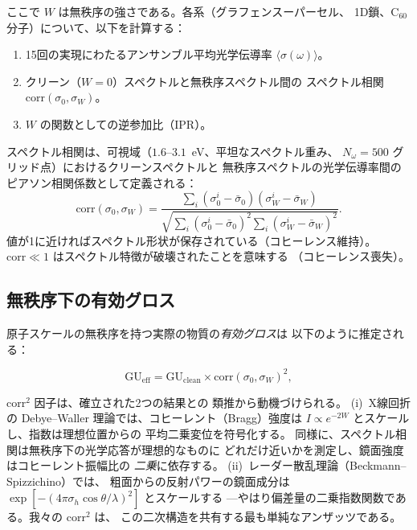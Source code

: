 \documentclass[twocolumn,showpacs,preprintnumbers,amsmath,amssymb,prb]{revtex4-2}
\begin{document}
\noindent ここで $W$ は無秩序の強さである。各系（グラフェンスーパーセル、
1D鎖、C$_{60}$ 分子）について、以下を計算する：

\begin{enumerate}
  \item 15回の実現にわたるアンサンブル平均光学伝導率
    $\langle\sigma(\omega)\rangle$。
  \item クリーン（$W=0$）スペクトルと無秩序スペクトル間の
    スペクトル相関 $\mathrm{corr}(\sigma_0, \sigma_W)$。
  \item $W$ の関数としての逆参加比（IPR）。
\end{enumerate}

スペクトル相関は、可視域（$1.6$--$3.1$~eV、平坦なスペクトル重み、
$N_\omega = 500$ グリッド点）におけるクリーンスペクトルと
無秩序スペクトルの光学伝導率間のピアソン相関係数として定義される：
\begin{equation}
  \mathrm{corr}(\sigma_0, \sigma_W) =
  \frac{\sum_i (\sigma_0^i - \bar{\sigma}_0)
        (\sigma_W^i - \bar{\sigma}_W)}
  {\sqrt{\sum_i (\sigma_0^i - \bar{\sigma}_0)^2
         \sum_i (\sigma_W^i - \bar{\sigma}_W)^2}}.
  \label{eq:corr}
\end{equation}
値が1に近ければスペクトル形状が保存されている（コヒーレンス維持）。
$\mathrm{corr} \ll 1$ はスペクトル特徴が破壊されたことを意味する
（コヒーレンス喪失）。

\subsection{無秩序下の有効グロス}

原子スケールの無秩序を持つ実際の物質の\emph{有効グロス}は
以下のように推定される：

\begin{equation}
  \mathrm{GU}_\mathrm{eff} = \mathrm{GU}_\mathrm{clean} \times
    \mathrm{corr}(\sigma_0, \sigma_W)^2,
  \label{eq:eff_gloss}
\end{equation}

\noindent $\mathrm{corr}^2$ 因子は、確立された2つの結果との
類推から動機づけられる。
(i)~X線回折の Debye--Waller 理論では、コヒーレント（Bragg）強度は
$I \propto e^{-2W}$ とスケールし、指数は理想位置からの
平均二乗変位を符号化する。
同様に、スペクトル相関は無秩序下の光学応答が理想的なものに
どれだけ近いかを測定し、鏡面強度はコヒーレント振幅比の
\emph{二乗}に依存する。
(ii)~レーダー散乱理論（Beckmann--Spizzichino）では、
粗面からの反射パワーの鏡面成分は
$\exp[-(4\pi\sigma_h\cos\theta/\lambda)^2]$ とスケールする
---やはり偏差量の二乗指数関数である。我々の $\mathrm{corr}^2$ は、
この二次構造を共有する最も単純なアンザッツである。
\end{document}
